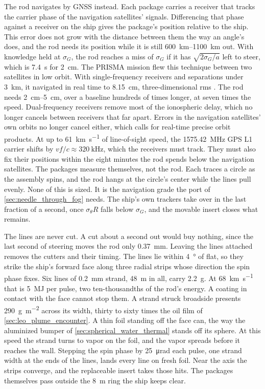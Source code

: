 \documentclass{article}
\begin{document}
The rod navigates by GNSS instead. Each package carries a receiver that tracks the carrier phase of the navigation satellites' signals. Differencing that phase against a receiver on the ship gives the package's position relative to the ship. This error does not grow with the distance between them the way an angle's does, and the rod needs its position while it is still \SIrange{600}{1100}{\kilo\meter} out. With knowledge held at $\sigma_G$, the rod reaches a miss of $\sigma_G$ if it has $\sqrt{2\sigma_G/a}$ left to steer, which is \SI{7.4}{\second} for \SI{2}{\centi\meter}. The PRISMA mission flew this technique between two satellites in low orbit. With single-frequency receivers and separations under \SI{3}{\kilo\meter}, it navigated in real time to \SI{8.15}{\centi\meter}, three-dimensional rms \cite{damico2011prisma_safe}. The rod needs \SIrange{2}{5}{\centi\meter}, over a baseline hundreds of times longer, at seven times the speed. Dual-frequency receivers remove most of the ionospheric delay, which no longer cancels between receivers that far apart. Errors in the navigation satellites' own orbits no longer cancel either, which calls for real-time precise orbit products. At up to \SI{61}{\kilo\meter\per\second} of line-of-sight speed, the \SI{1575.42}{\mega\hertz} GPS L1 carrier shifts by $vf/c\approx\SI{320}{\kilo\hertz}$, which the receivers must track. They must also fix their positions within the eight minutes the rod spends below the navigation satellites. The packages measure themselves, not the rod. Each traces a circle as the assembly spins, and the rod hangs at the circle's center while the lines pull evenly. None of this is sized. It is the navigation grade the port of \autoref{sec:needle_through_fog} needs. The ship's own trackers take over in the last fraction of a second, once $\sigma_\theta R$ falls below $\sigma_G$, and the movable insert closes what remains.

The lines are never cut. A cut about a second out would buy nothing, since the last second of steering moves the rod only \SI{0.37}{\milli\meter}. Leaving the lines attached removes the cutters and their timing. The lines lie within \SI{4}{\degree} of flat, so they strike the ship's forward face along three radial strips whose direction the spin phase fixes. Six lines of \SI{0.2}{\milli\meter} strand, \SI{48}{\meter} in all, carry \SI{2.2}{\gram}. At \SI{68}{\kilo\meter\per\second} that is \SI{5}{\mega\joule} per pulse, two ten-thousandths of the rod's energy. A coating in contact with the face cannot stop them. A strand struck broadside presents \SI{290}{\gram\per\square\meter} across its width, thirty to sixty times the oil film of \autoref{sec:leo_plume_encounter}. A thin foil standing off the face can, the way the aluminized bumper of \autoref{sec:spherical_water_thermal} stands off its sphere. At this speed the strand turns to vapor on the foil, and the vapor spreads before it reaches the wall. Stepping the spin phase by \SI{25}{\micro\radian} each pulse, one strand width at the ends of the lines, lands every line on fresh foil. Near the axis the strips converge, and the replaceable insert takes those hits. The packages themselves pass outside the \SI{8}{\meter} ring the ship keeps clear.
\end{document}
